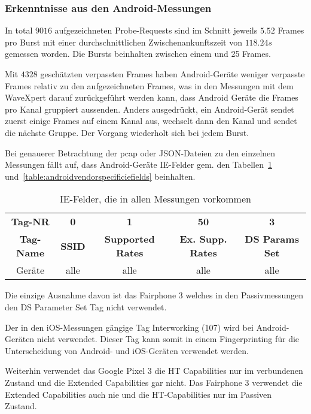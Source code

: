 \clearpage

\subsubsection*{Erkenntnisse aus den Android-Messungen}
In total $9016$ aufgezeichneten Probe-Requests sind im Schnitt jeweils $5.52$ 
Frames pro Burst mit einer durchschnittlichen Zwischenankunftszeit von $118.24 s$
gemessen worden. Die Bursts beinhalten zwischen einem und 25 Frames.

Mit $4328$ geschätzten verpassten Frames haben Android-Geräte weniger verpasste
Frames relativ zu den aufgezeichneten Frames, was in den Messungen mit dem 
WaveXpert darauf zurückgeführt werden kann, dass Android Geräte die Frames 
pro Kanal gruppiert aussenden. Anders ausgedrückt, ein Android-Gerät sendet 
zuerst einige Frames auf einem Kanal aus, wechselt dann den Kanal und sendet
die nächste Gruppe. Der Vorgang wiederholt sich bei jedem Burst.

Bei genauerer Betrachtung der pcap oder JSON-Dateien zu den einzelnen Messungen
fällt auf, dass Android-Geräte IE-Felder gem. den Tabellen~\ref{table:androidcommoniefields}
und~\ref{table:androidvendorspecificiefields} beinhalten.


\begin{table}[h!]
    \centering
    \begin{tabular}{|c|c|c|c|c|}
        \hline
        \textbf{Tag-NR} & \textbf{0} & \textbf{1} & \textbf{50} & \textbf{3} \\
        \textbf{Tag-Name} & \textbf{SSID} & \textbf{Supported Rates} & \textbf{Ex. Supp. Rates} & \textbf{DS Params Set} \\
        \hline 
        Geräte & alle & alle & alle & alle \\
        \hline
    \end{tabular}
    \caption{IE-Felder, die in allen Messungen vorkommen
    \label{table:androidcommoniefields}}  
\end{table}
Die einzige Ausnahme davon ist das Fairphone 3 welches in den Passivmessungen den 
DS Parameter Set Tag nicht verwendet.

Der in den iOS-Messungen gängige Tag Interworking (107) wird bei Android-Geräten 
nicht verwendet. Dieser Tag kann somit in einem Fingerprinting für die Unterscheidung
von Android- und iOS-Geräten verwendet werden.

Weiterhin verwendet das Google Pixel 3 die HT Capabilities nur im verbundenen Zustand
und die Extended Capabilities gar nicht. Das Fairphone 3 verwendet die Extended Capabilities
auch nie und die HT-Capabilities nur im Passiven Zustand.

